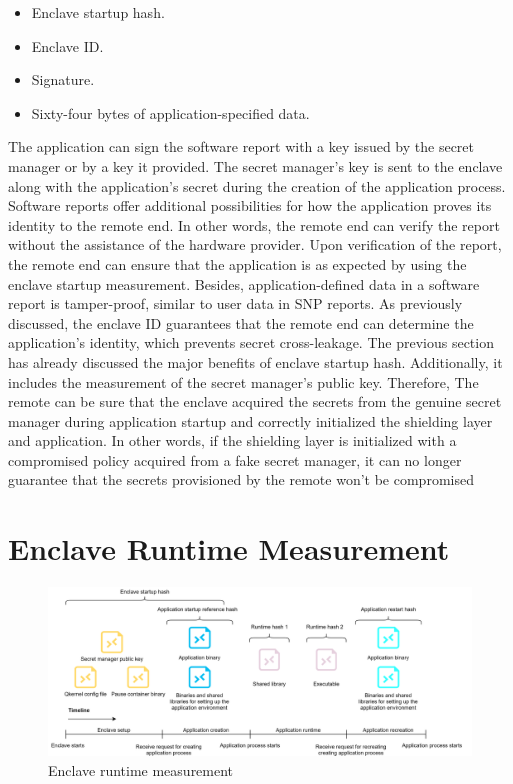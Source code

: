 \begin{itemize}
    \item Enclave startup hash.
    \item Enclave ID.
    \item Signature.
    \item Sixty-four bytes of application-specified data.
\end{itemize}

The application can sign the software report with a key issued by the secret manager or by a key it provided. The secret manager's key is sent to the enclave along with the application's secret during the creation of the application process. Software reports offer additional possibilities 
for how the application proves its identity to the remote end. In other words, the remote end can verify the report without the assistance of the hardware provider. Upon verification of the report, the remote end can ensure that the application is as expected by using the enclave startup 
measurement. Besides, application-defined data in a software report is tamper-proof, similar to user data in SNP reports. As previously discussed, the enclave ID guarantees that the remote end can determine the application's identity, which prevents secret cross-leakage. The previous 
section has already discussed the major benefits of enclave startup hash. Additionally, it includes the measurement of the secret manager's public key. Therefore, The remote can be sure that the enclave acquired the secrets from the genuine secret manager during application startup and 
correctly initialized the shielding layer and application. In other words, if the shielding layer is initialized with a compromised policy acquired from a fake secret manager, it can no longer guarantee that the secrets provisioned by the remote won't be compromised




\section{Enclave Runtime Measurement}
\label{sec:Enclave_Runtime_Measurement}
\begin{figure}[!htb]
    \centering
    \includegraphics[width=1\textwidth]{images/soft_ware_manager_meausrment.png}
    \caption[Enclave runtime measurement]{Enclave runtime measurement}
    \label{fig:soft_ware_manager_meausrment}
\end{figure}

